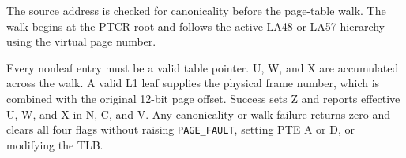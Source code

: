 The source address is checked for canonicality before the page-table walk. The walk begins at the PTCR root and follows the active LA48 or LA57 hierarchy using the virtual page number.

Every nonleaf entry must be a valid table pointer. U, W, and X are accumulated across the walk. A valid L1 leaf supplies the physical frame number, which is combined with the original 12-bit page offset. Success sets Z and reports effective U, W, and X in N, C, and V. Any canonicality or walk failure returns zero and clears all four flags without raising \texttt{PAGE\_FAULT}, setting PTE A or D, or modifying the TLB.
